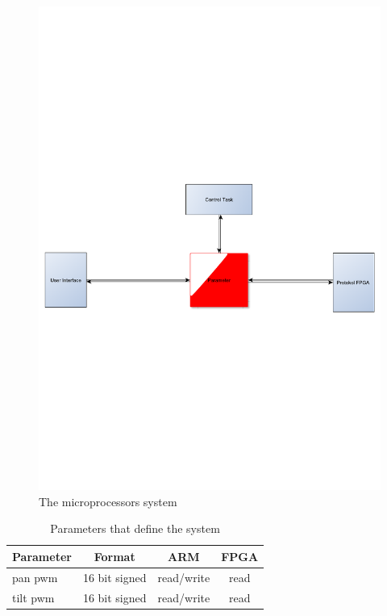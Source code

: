 \begin{figure}[htb]
	\centering
	\includegraphics[scale=0.5,clip,trim=0 300 0 300]{graphics/microprocessor} %
	\caption{The microprocessors system}
	\label{fig:microprocessor}			%
\end{figure}


\begin{table}[htb]				
	\begin{center}
	\begin{tabular}{l|c|c|c}			
	Parameter & Format & ARM & FPGA \\		
	\hline												
pan pwm &16 bit signed & read/write & read \\
tilt pwm & 16 bit signed  & read/write & read
	\end{tabular}
	\end{center}
	\caption{Parameters that define the system}				
	\label{tab:parameters}			
\end{table}


